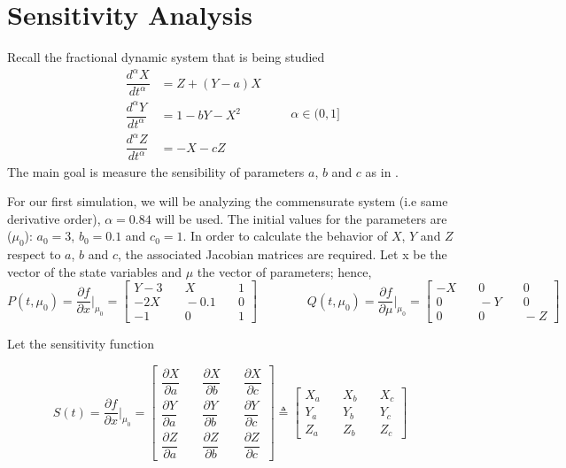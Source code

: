 \section{Sensitivity Analysis}
Recall the fractional dynamic system that is being studied
\begin{equation}\label{eq:mainSystem}
	    \begin{array}{ll}
            \dfrac{d^{\alpha}X}{dt^{\alpha}}&=Z+(Y-a)X\\
            \dfrac{d^{\alpha}Y}{dt^{\alpha}}&=1-bY-X^2\\
            \dfrac{d^{\alpha}Z}{dt^{\alpha}}&=-X-cZ
        \end{array} \qquad \alpha\in(0,1]
\end{equation}
The main goal is measure the sensibility of parameters $a$, $b$ and $c$ as in \cite{guo2016sensitivity}.


For our first simulation, we will be analyzing the commensurate system (i.e same derivative order), $\alpha=0.84$ will be used. The initial values for the parameters are ($\mu_0$): $a_0=3$, $b_0=0.1$ and $c_0=1$. In order to calculate the behavior of $X$, $Y$ and $Z$ respect to $a$, $b$ and $c$, the associated Jacobian matrices are required. Let x be the vector of the state variables and $\mu$ the vector of parameters; hence,
\begin{equation}
	P(t,\mu_0)=\dfrac{\partial f}{\partial x}\Bigr|_{\mu_0} = \left[\begin{array}{ccc}
	Y-3 &\quad X 	&\quad 1\\ 
    -2X 	&\quad -0.1 	&\quad 0\\
    -1 		&\quad 0 	&\quad 1
	\end{array}\right] \qquad\qquad
    Q(t,\mu_0)=\dfrac{\partial f}{\partial \mu}\Bigr|_{\mu_0} = \left[\begin{array}{ccc}
	-X &\quad 0 	&\quad 0\\ 
    0  &\quad -Y 	&\quad 0\\
    0  &\quad 0 	&\quad -Z
	\end{array}\right]
\end{equation}

Let the sensitivity function

\begin{equation}
	S(t) = \dfrac{\partial f}{\partial x}\Bigr|_{\mu_0} = \left[
    \begin{array}{ccc}
		\dfrac{\partial X}{\partial a} &\quad \dfrac{\partial X}{\partial b} &\quad \dfrac{\partial X}{\partial c}\\
        \dfrac{\partial Y}{\partial a} &\quad \dfrac{\partial Y}{\partial b} &\quad \dfrac{\partial Y}{\partial c}\\
        \dfrac{\partial Z}{\partial a} &\quad \dfrac{\partial Z}{\partial b} &\quad \dfrac{\partial Z}{\partial c}
    \end{array}
    \right]\triangleq\left[
    \begin{array}{ccc}
		X_a&\quad  X_b&\quad X_c\\
        Y_a&\quad  Y_b&\quad Y_c\\
        Z_a&\quad  Z_b&\quad Z_c
    \end{array}
    \right]
\end{equation}

